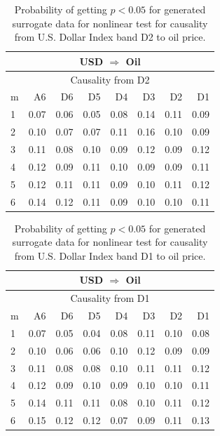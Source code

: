 %
%
\begin{table}[H]
\begin{center}
\begin{tabular}{l|r r r r r r r}
\hline\hline
\multicolumn{8}{c}{USD $\Rightarrow$ Oil}\\
\hline
\multicolumn{8}{c}{Causality from D2}\\
\hline\hline
m & A6 & D6 & D5 & D4 & D3 & D2 & D1 \\
\hline
1 & 0.07 & 0.06 & 0.05 & 0.08 & 0.14 & 0.11 & 0.09 \\
2 & 0.10 & 0.07 & 0.07 & 0.11 & 0.16 & 0.10 & 0.09 \\
3 & 0.11 & 0.08 & 0.10 & 0.09 & 0.12 & 0.09 & 0.12 \\
4 & 0.12 & 0.09 & 0.11 & 0.10 & 0.09 & 0.09 & 0.11 \\
5 & 0.12 & 0.11 & 0.11 & 0.09 & 0.10 & 0.11 & 0.12 \\
6 & 0.14 & 0.12 & 0.11 & 0.09 & 0.10 & 0.10 & 0.11 \\
\hline\hline
\end{tabular}
\caption{Probability of getting $p < 0.05$ for generated surrogate data for nonlinear test for causality from U.S. Dollar Index band D2 to oil price.}
\end{center}
\end{table}

%
%
\begin{table}[H]
\begin{center}
\begin{tabular}{l|r r r r r r r}
\hline\hline
\multicolumn{8}{c}{USD $\Rightarrow$ Oil}\\
\hline
\multicolumn{8}{c}{Causality from D1}\\
\hline\hline
m & A6 & D6 & D5 & D4 & D3 & D2 & D1 \\
\hline
1 & 0.07 & 0.05 & 0.04 & 0.08 & 0.11 & 0.10 & 0.08 \\
2 & 0.10 & 0.06 & 0.06 & 0.10 & 0.12 & 0.09 & 0.09 \\
3 & 0.11 & 0.08 & 0.08 & 0.10 & 0.11 & 0.11 & 0.12 \\
4 & 0.12 & 0.09 & 0.10 & 0.09 & 0.10 & 0.10 & 0.11 \\
5 & 0.14 & 0.11 & 0.11 & 0.08 & 0.10 & 0.11 & 0.12 \\
6 & 0.15 & 0.12 & 0.12 & 0.07 & 0.09 & 0.11 & 0.13 \\
\hline\hline
\end{tabular}
\caption{Probability of getting $p < 0.05$ for generated surrogate data for nonlinear test for causality from U.S. Dollar Index band D1 to oil price.}
\end{center}
\end{table}

